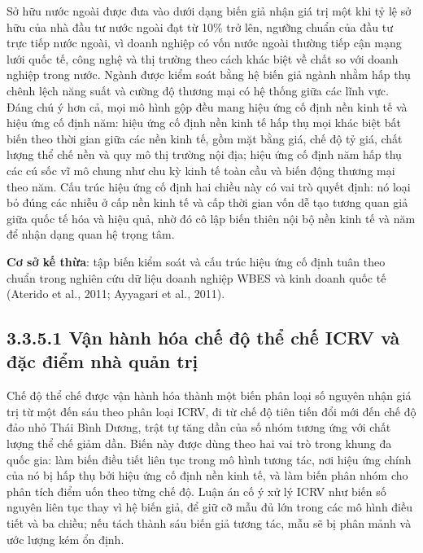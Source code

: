 \documentclass[
  a4paper,
  13pt]{extreport}
\begin{document}
Sở hữu nước ngoài được đưa vào dưới dạng biến giả nhận giá trị một khi
tỷ lệ sở hữu của nhà đầu tư nước ngoài đạt từ 10\% trở lên, ngưỡng chuẩn
của đầu tư trực tiếp nước ngoài, vì doanh nghiệp có vốn nước ngoài
thường tiếp cận mạng lưới quốc tế, công nghệ và thị trường theo cách
khác biệt về chất so với doanh nghiệp trong nước. Ngành được kiểm soát
bằng hệ biến giả ngành nhằm hấp thụ chênh lệch năng suất và cường độ
thương mại có hệ thống giữa các lĩnh vực. Đáng chú ý hơn cả, mọi mô hình
gộp đều mang hiệu ứng cố định nền kinh tế và hiệu ứng cố định năm: hiệu
ứng cố định nền kinh tế hấp thụ mọi khác biệt bất biến theo thời gian
giữa các nền kinh tế, gồm mặt bằng giá, chế độ tỷ giá, chất lượng thể
chế nền và quy mô thị trường nội địa; hiệu ứng cố định năm hấp thụ các
cú sốc vĩ mô chung như chu kỳ kinh tế toàn cầu và biến động thương mại
theo năm. Cấu trúc hiệu ứng cố định hai chiều này có vai trò quyết định:
nó loại bỏ đúng các nhiễu ở cấp nền kinh tế và cấp thời gian vốn dễ tạo
tương quan giả giữa quốc tế hóa và hiệu quả, nhờ đó cô lập biến thiên
nội bộ nền kinh tế và năm để nhận dạng quan hệ trọng tâm.

\textbf{Cơ sở kế thừa}: tập biến kiểm soát và cấu trúc hiệu ứng cố định
tuân theo chuẩn trong nghiên cứu dữ liệu doanh nghiệp WBES và kinh doanh
quốc tế (Aterido et al., 2011; Ayyagari et al., 2011).

\hypertarget{vux1eadn-huxe0nh-huxf3a-chux1ebf-ux111ux1ed9-thux1ec3-chux1ebf-icrv-vuxe0-ux111ux1eb7c-ux111iux1ec3m-nhuxe0-quux1ea3n-trux1ecb}{%
\subsection{3.3.5.1 Vận hành hóa chế độ thể chế ICRV và đặc điểm nhà
quản
trị}\label{vux1eadn-huxe0nh-huxf3a-chux1ebf-ux111ux1ed9-thux1ec3-chux1ebf-icrv-vuxe0-ux111ux1eb7c-ux111iux1ec3m-nhuxe0-quux1ea3n-trux1ecb}}

Chế độ thể chế được vận hành hóa thành một biến phân loại số nguyên nhận
giá trị từ một đến sáu theo phân loại ICRV, đi từ chế độ tiên tiến đổi
mới đến chế độ đảo nhỏ Thái Bình Dương, trật tự tăng dần của số nhóm
tương ứng với chất lượng thể chế giảm dần. Biến này được dùng theo hai
vai trò trong khung đa quốc gia: làm biến điều tiết liên tục trong mô
hình tương tác, nơi hiệu ứng chính của nó bị hấp thụ bởi hiệu ứng cố
định nền kinh tế, và làm biến phân nhóm cho phân tích điểm uốn theo từng
chế độ. Luận án cố ý xử lý ICRV như biến số nguyên liên tục thay vì hệ
biến giả, để giữ cỡ mẫu đủ lớn trong các mô hình điều tiết và ba chiều;
nếu tách thành sáu biến giả tương tác, mẫu sẽ bị phân mảnh và ước lượng
kém ổn định.
\end{document}
